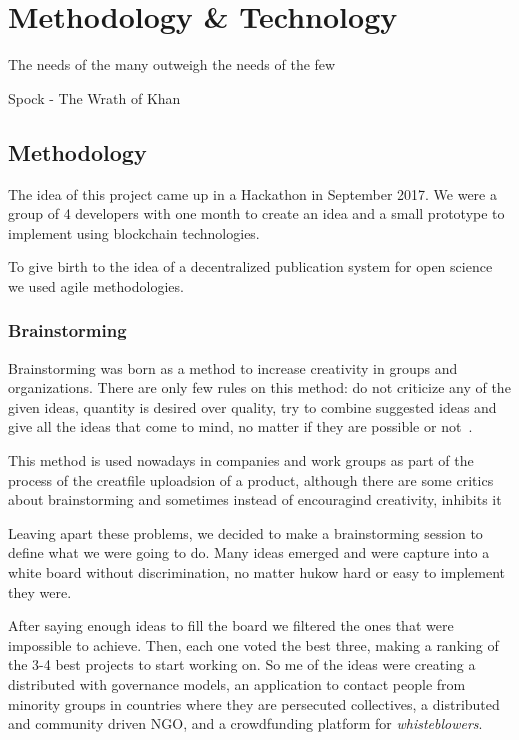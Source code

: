 \chapter{Methodology \& Technology}

\begin{FraseCelebre}
  \begin{Frase}
    The needs of the many outweigh the needs of the few
  \end{Frase}
  \begin{Fuente}
    Spock - The Wrath of Khan
  \end{Fuente}
\end{FraseCelebre}

\section{Methodology}
The idea of this project came up in a Hackathon in September 2017. We were a
group of 4 developers with one month to create an idea and a small prototype to
implement using blockchain technologies.

To give birth to the idea of a decentralized publication system for open science
we used agile methodologies.


\subsection{Brainstorming}

Brainstorming was born as a method to increase creativity in groups and
organizations. There are only few rules on this method: do not criticize any of
the given ideas, quantity is desired over quality, try to combine suggested
ideas and give all the ideas that come to mind, no matter if they are possible
or not~\cite{osborn1953applied}.

This method is used nowadays in companies and work groups as part of the process
of the creatfile uploadsion of a product, although there are some critics about
brainstorming and sometimes instead of encouragind creativity, inhibits
it~\cite{sutton1996brainstorming,mullen1991productivity}

Leaving apart these problems, we decided to make a brainstorming session to
define what we were going to do. Many ideas emerged and were capture into a
white board without discrimination, no matter hukow hard or easy to implement
they were.

After saying enough ideas to fill the board we filtered the ones that were
impossible to achieve. Then, each one voted the best three, making a ranking of
the 3-4 best projects to start working on. So me of the ideas were creating a
distributed  with governance models, an application to contact
people from minority groups in countries where they are persecuted collectives,
a distributed and community driven NGO, and a crowdfunding platform for
\emph{whisteblowers}.

